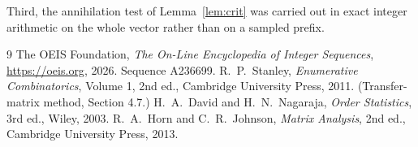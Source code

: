 \documentclass[11pt,a4paper]{article}
\theoremstyle{plain}
\theoremstyle{definition}
\begin{document}
Third, the annihilation test of Lemma~\ref{lem:crit} was carried out in exact integer
arithmetic on the whole vector rather than on a sampled prefix.

\begin{thebibliography}{9}
 The OEIS Foundation, \emph{The On-Line Encyclopedia of Integer
Sequences}, \url{https://oeis.org}, 2026. Sequence A236699.
 R.~P.~Stanley, \emph{Enumerative Combinatorics}, Volume 1, 2nd ed.,
Cambridge University Press, 2011. (Transfer-matrix method, Section 4.7.)
 H.~A.~David and H.~N.~Nagaraja, \emph{Order Statistics}, 3rd ed., Wiley,
2003.
 R.~A.~Horn and C.~R.~Johnson, \emph{Matrix Analysis}, 2nd ed., Cambridge
University Press, 2013.
\end{thebibliography}
\end{document}
